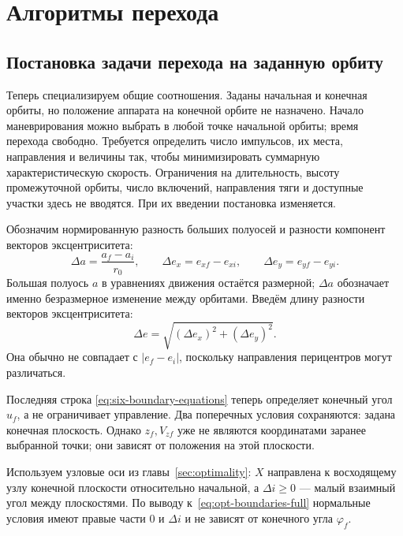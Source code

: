 \section{Алгоритмы перехода}
\label{sec:algorithms}

\subsection{Постановка задачи перехода на заданную орбиту}
\label{sec:five-boundaries}

Теперь специализируем общие соотношения. Заданы начальная
и конечная орбиты, но положение аппарата на конечной орбите
не назначено. Начало маневрирования можно выбрать в любой точке
начальной орбиты; время перехода свободно. Требуется определить
число импульсов, их места, направления и величины так, чтобы
минимизировать суммарную характеристическую скорость.
Ограничения на длительность, высоту промежуточной орбиты,
число включений, направления тяги и доступные участки здесь
не вводятся. При их введении постановка изменяется.

Обозначим нормированную разность больших полуосей и разности
компонент векторов эксцентриситета:
\begin{equation}
 \Delta a=\frac{a_f-a_i}{r_0},\qquad
 \Delta e_x=e_{xf}-e_{xi},\qquad
 \Delta e_y=e_{yf}-e_{yi}.
 \label{eq:boundary-orbit-differences}
\end{equation}
Большая полуось $a$ в уравнениях движения остаётся размерной;
$\Delta a$ обозначает именно безразмерное изменение между орбитами.
Введём длину разности векторов эксцентриситета:
\begin{equation}
 \Delta e=\sqrt{(\Delta e_x)^2+(\Delta e_y)^2}.
 \label{eq:transfer-data}
\end{equation}
Она обычно не совпадает с $|e_f-e_i|$, поскольку направления
перицентров могут различаться.

Последняя строка \eqref{eq:six-boundary-equations} теперь определяет
конечный угол $u_f$, а не ограничивает управление.
Два поперечных условия сохраняются: задана конечная плоскость.
Однако $z_f,V_{zf}$ уже не являются координатами заранее выбранной
точки; они зависят от положения на этой плоскости.

Используем узловые оси из главы~\ref{sec:optimality}:
$X$ направлена к восходящему узлу конечной плоскости относительно
начальной, а $\Delta i\geq0$ --- малый взаимный угол между плоскостями.
По выводу к~\eqref{eq:opt-boundaries-full} нормальные условия имеют
правые части $0$ и $\Delta i$ и не зависят от конечного угла $\varphi_f$.

